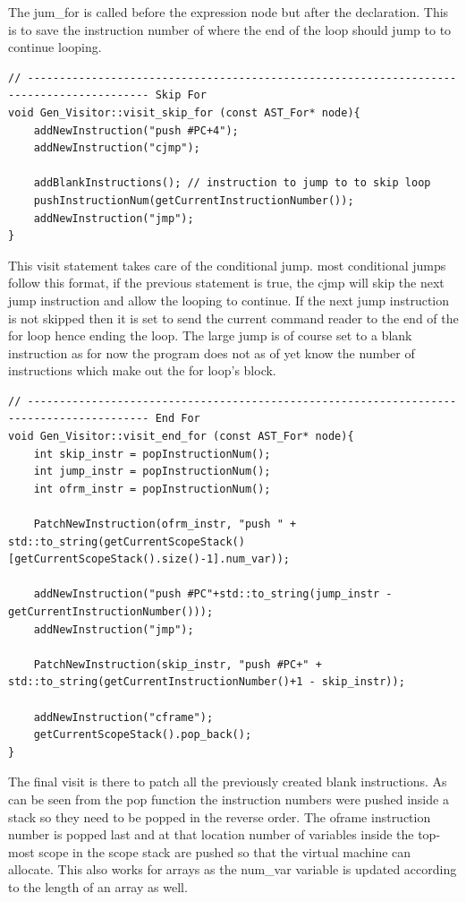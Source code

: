 \documentclass[12pt, a4paper]{report}
\begin{document}
The jum\_for is called before the expression node but after the declaration. This is to save the instruction number of where the end of the loop should jump to to continue looping.
\begin{verbatim}
// ----------------------------------------------------------------------------------------- Skip For
void Gen_Visitor::visit_skip_for (const AST_For* node){
    addNewInstruction("push #PC+4");
    addNewInstruction("cjmp");

    addBlankInstructions(); // instruction to jump to to skip loop
    pushInstructionNum(getCurrentInstructionNumber());
    addNewInstruction("jmp");
}
\end{verbatim}
This visit statement takes care of the conditional jump. most conditional jumps follow this format, if the previous statement is true, the cjmp will skip the next jump instruction and allow the looping to continue. If the next jump instruction is not skipped then it is set to send the current command reader to the end of the for loop hence ending the loop. The large jump is of course set to a blank instruction as for now the program does not as of yet know the number of instructions which make out the for loop's block.
\begin{verbatim}
// ----------------------------------------------------------------------------------------- End For
void Gen_Visitor::visit_end_for (const AST_For* node){
    int skip_instr = popInstructionNum();
    int jump_instr = popInstructionNum();
    int ofrm_instr = popInstructionNum();

    PatchNewInstruction(ofrm_instr, "push " + std::to_string(getCurrentScopeStack()[getCurrentScopeStack().size()-1].num_var));

    addNewInstruction("push #PC"+std::to_string(jump_instr - getCurrentInstructionNumber()));
    addNewInstruction("jmp");

    PatchNewInstruction(skip_instr, "push #PC+" + std::to_string(getCurrentInstructionNumber()+1 - skip_instr));

    addNewInstruction("cframe");
    getCurrentScopeStack().pop_back();
}
\end{verbatim}
The final visit is there to patch all the previously created blank instructions. As can be seen from the pop function the instruction numbers were pushed inside a stack so they need to be popped in the reverse order. The oframe instruction number is popped last and at that location number of variables inside the top-most scope in the scope stack are pushed so that the virtual machine can allocate. This also works for arrays as the num\_var variable is updated according to the length of an array as well.
\end{document}
